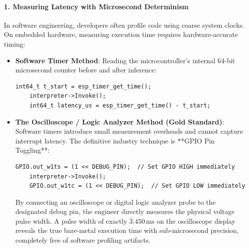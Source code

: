 \paragraph{1. Measuring Latency with Microsecond Determinism}
In software engineering, developers often profile code using coarse system clocks. On embedded hardware, measuring execution time requires hardware-accurate timing:
\begin{itemize}
    \item \textbf{Software Timer Method}: Reading the microcontroller's internal 64-bit microsecond counter before and after inference:
    \begin{lstlisting}[style=pythonstyle, numbers=none]
    int64_t t_start = esp_timer_get_time();
    interpreter->Invoke();
    int64_t latency_us = esp_timer_get_time() - t_start;
    \end{lstlisting}
    \item \textbf{The Oscilloscope / Logic Analyzer Method (Gold Standard)}: Software timers introduce small measurement overheads and cannot capture interrupt latency. The definitive industry technique is **GPIO Pin Toggling**:
    \begin{lstlisting}[style=pythonstyle, numbers=none]
    GPIO.out_w1ts = (1 << DEBUG_PIN);  // Set GPIO HIGH immediately
    interpreter->Invoke();
    GPIO.out_w1tc = (1 << DEBUG_PIN);  // Set GPIO LOW immediately
    \end{lstlisting}
    By connecting an oscilloscope or digital logic analyzer probe to the designated debug pin, the engineer directly measures the physical voltage pulse width. A pulse width of exactly $3.450\,\text{ms}$ on the oscilloscope display reveals the true bare-metal execution time with sub-microsecond precision, completely free of software profiling artifacts.
\end{itemize}

